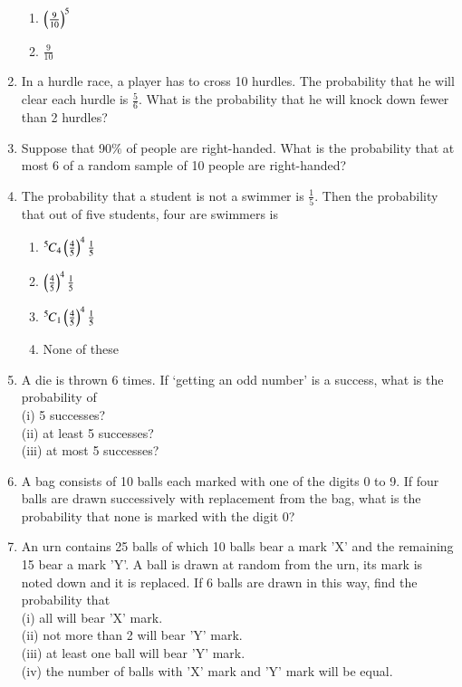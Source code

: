 \begin{enumerate}[label=\thesection.\arabic*.,ref=\thesection.\theenumi]
\begin{enumerate}
\item $\left(\frac{9}{10}\right)^5$
\item $\frac{9}{10}$
\end{enumerate}
%
\solution

\item In a hurdle race, a player has to cross 10 hurdles. The probability that he will
clear each hurdle is $\frac{5}{6}$. What is the probability that he will knock down fewer than 2 hurdles?\\
\solution 

\item Suppose that 90$\%$ of people are right-handed. What is the probability that
at most 6 of a random sample of 10 people are right-handed?\\
\solution

\item The probability that a student is not a swimmer is $\frac{1}{5}$. Then the probability that out of five students, four are swimmers is\\
\begin{enumerate}
\item ${{}^{5}\mkern-1muC_{4}}\left(\frac{4}{5}\right)^4 \frac{1}{5}$
\item $\left(\frac{4}{5}\right)^4 \frac{1}{5}$
\item ${{}^{5}\mkern-1muC_{1}}\left(\frac{4}{5}\right)^4 \frac{1}{5}$
\item None of these
\end{enumerate}
\solution

%
\item A die is thrown 6 times. If ‘getting an odd number’ is a success, what is the probability of\\
(i) 5 successes?\\
(ii) at least 5 successes?\\
(iii) at most 5 successes?\\
%
\solution

\item A bag consists of 10 balls each marked with one of the digits 0 to 9. If four balls are drawn successively with replacement from the bag, what is the probability that none is marked with the digit 0?\\
\solution

%
\item An urn contains 25 balls of which 10 balls bear a mark 'X' and the remaining 15 bear a mark 'Y'. A ball is drawn at random from the urn, its mark is noted down and it is replaced. If 6 balls are drawn in this way, find the probability that\\
(i) all will bear 'X' mark.\\
(ii) not more than 2 will bear 'Y' mark.\\
(iii) at least one ball will bear 'Y' mark.\\
(iv) the number of balls with 'X' mark and 'Y' mark will be equal.\\
\solution



\end{enumerate}

